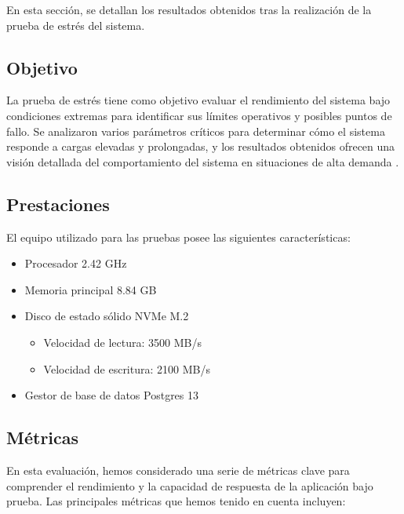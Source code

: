 \documentclass[10pt,times,twocolumn]{article}
\begin{document}
En esta sección, se detallan los resultados obtenidos tras la realización de la prueba de estrés del sistema.

\subsection{Objetivo}

La prueba de estrés tiene como objetivo evaluar el rendimiento del sistema bajo condiciones extremas para identificar sus límites operativos y posibles puntos de fallo. Se analizaron varios parámetros críticos para determinar cómo el sistema responde a cargas elevadas y prolongadas, y los resultados obtenidos ofrecen una visión detallada del comportamiento del sistema en situaciones de alta demanda \cite{pressman}.

\subsection{Prestaciones}

El equipo utilizado para las pruebas posee las siguientes características:
\begin{itemize}
	\item Procesador 2.42 GHz
	\item Memoria principal 8.84 GB
	\item Disco de estado sólido NVMe M.2
	\begin{itemize}
		\item Velocidad de lectura: 3500 MB/s
		\item Velocidad de escritura: 2100 MB/s
	\end{itemize}
	\item Gestor de base de datos Postgres 13
\end{itemize}

\subsection{Métricas}

En esta evaluación, hemos considerado una serie de métricas clave para comprender el rendimiento y la capacidad de respuesta de la aplicación bajo prueba. Las principales métricas que hemos tenido en cuenta incluyen:
\end{document}

